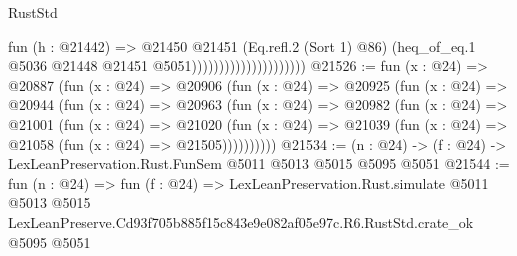\begin{lexlean}{RustStd}
\begin{coremodule}
                                          fun (h : @21442) =>
                                          @21450
                                            @21451
                                            (Eq.refl.{2} (Sort 1) @86)
                                            (heq_of_eq.{1}
                                              @5036
                                              @21448
                                              @21451
                                              @5051)))))))))))))))))))))
@21526 := fun (x : @24) =>
  @20887
    (fun (x : @24) =>
    @20906
      (fun (x : @24) =>
      @20925
        (fun (x : @24) =>
        @20944
          (fun (x : @24) =>
          @20963
            (fun (x : @24) =>
            @20982
              (fun (x : @24) =>
              @21001
                (fun (x : @24) =>
                @21020
                  (fun (x : @24) =>
                  @21039 (fun (x : @24) => @21058 (fun (x : @24) => @21505))))))))))
@21534 := (n : @24) -> (f : @24) -> LexLeanPreservation.Rust.FunSem @5011 @5013 @5015 @5095 @5051
@21544 := fun (n : @24) =>
  fun (f : @24) =>
  LexLeanPreservation.Rust.simulate
    @5011
    @5013
    @5015
    LexLeanPreserve.Cd93f705b885f15c843e9e082af05e97c.R6.RustStd.crate_ok
    @5095
    @5051
\end{coremodule}
\end{lexlean}
